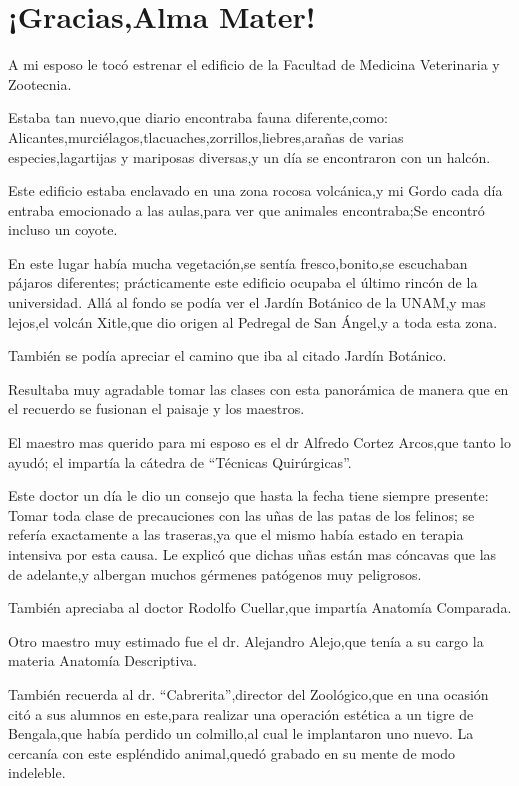 \documentclass[letterpaper,12pt]{book}
\begin{document}
\chapter{¡Gracias,Alma Mater!}
A mi esposo le tocó estrenar el edificio de la Facultad de Medicina Veterinaria y Zootecnia. 

Estaba tan nuevo,que diario encontraba fauna diferente,como: Alicantes,murciélagos,tlacuaches,zorrillos,liebres,arañas de varias especies,lagartijas y mariposas diversas,y un día se encontraron con un halcón.

Este edificio estaba enclavado en una zona rocosa volcánica,y mi Gordo cada día entraba emocionado a las aulas,para ver que animales encontraba;Se encontró incluso un coyote.

En este lugar había mucha vegetación,se sentía fresco,bonito,se escuchaban pájaros diferentes; prácticamente este edificio ocupaba el último rincón de la universidad.
Allá al fondo se podía ver el Jardín Botánico de la UNAM,y mas lejos,el volcán Xitle,que dio origen al Pedregal de San Ángel,y a toda esta zona.

También se podía apreciar el camino que iba al citado Jardín Botánico.

Resultaba muy agradable tomar las clases con esta panorámica de manera que en el recuerdo se fusionan el paisaje y los maestros.

El maestro mas querido para mi esposo es el dr Alfredo Cortez Arcos,que tanto lo ayudó; el impartía la cátedra de ``Técnicas Quirúrgicas''.

Este doctor un día le dio un  consejo que hasta la fecha tiene siempre presente: Tomar toda clase de precauciones con las uñas de las patas de los felinos; se refería exactamente a las traseras,ya que el mismo había estado en terapia intensiva por esta causa. Le explicó que dichas uñas están mas cóncavas que las de adelante,y albergan muchos gérmenes patógenos muy peligrosos.

También apreciaba al doctor Rodolfo Cuellar,que impartía Anatomía Comparada.

Otro maestro muy estimado fue el dr. Alejandro Alejo,que tenía a su cargo la materia Anatomía Descriptiva.

También recuerda al dr. ``Cabrerita'',director del Zoológico,que en una ocasión citó a sus alumnos en este,para realizar una operación estética a un tigre de Bengala,que había perdido un colmillo,al cual le implantaron uno nuevo. La cercanía con este espléndido animal,quedó grabado en su mente de modo
indeleble.
\end{document}
